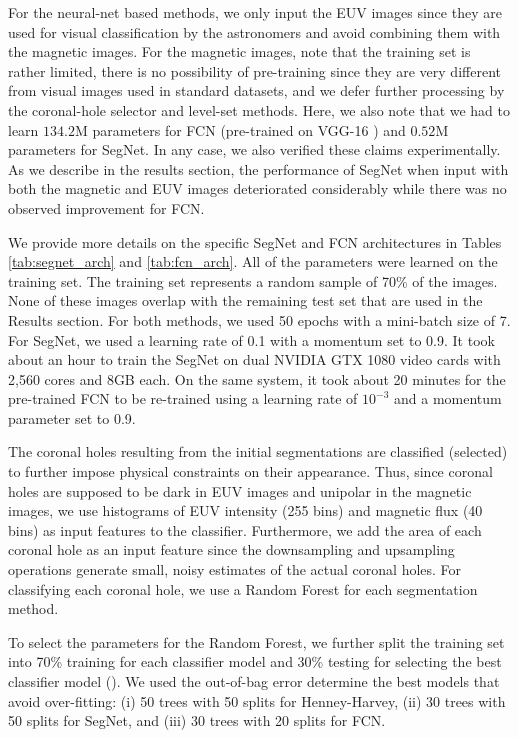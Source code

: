 \documentclass[journal]{IEEEtran}
\begin{document}
For the neural-net based methods,
   we only input the EUV images since they are used
   for visual classification by the astronomers and avoid
   combining them with the magnetic images.
For the magnetic images, 
    note that the training set is rather limited, 
   there is no possibility of pre-training since they are very different
   from visual images used in standard datasets,
   and we defer further processing by 
   the coronal-hole selector and level-set methods.   
Here, we also note that we had to learn $134.2$M parameters for FCN
   (pre-trained on VGG-16 \cite{VGGNet,VGG16})
   and $0.52$M parameters for SegNet.
In any case, we also verified these claims experimentally.
As we describe in the results section, the performance
   of SegNet when input with both the magnetic and EUV images 
   deteriorated considerably while there was no observed 
   improvement for FCN.
  
   
We provide more details on the specific SegNet and FCN
   architectures in Tables \ref{tab:segnet_arch} and \ref{tab:fcn_arch}.
All of the parameters were learned on the training set.
The training set represents a random sample of 70\% of the images.
None of these images overlap with the remaining test set that
   are used in the Results section.
For both methods, we used 50 epochs with a mini-batch size of 7.
For SegNet, we used a learning rate of 0.1 with a momentum set to 0.9.
It took about an hour to train the SegNet on dual NVIDIA GTX 1080 video cards 
    with 2,560 cores and 8GB each.
On the same system, it took about 20 minutes for the pre-trained FCN to be re-trained   
   using a learning rate of $10^{-3}$ and a momentum parameter set to 0.9.

The coronal holes resulting from the initial segmentations
   are classified (selected) to further impose physical constraints
   on their appearance.
Thus, since coronal holes are supposed to be dark in EUV images
   and unipolar in the magnetic images, we use
   histograms of EUV intensity (255 bins) and magnetic flux (40 bins)
   as input features to the classifier.
Furthermore, we add the area of each coronal hole as an input feature
   since the downsampling and upsampling operations
   generate small, noisy estimates of the actual coronal holes.
For classifying each coronal hole, we use a Random Forest for each segmentation method.

To select the parameters for the Random Forest, we further split
    the training set into 70\% training for each classifier model
    and 30\% testing for selecting the best classifier model
    (\cite{ESLII}).
We used the out-of-bag error determine the best models
    that avoid over-fitting:
    (i)   50 trees with 50 splits for Henney-Harvey,
    (ii)  30 trees with 50 splits for SegNet, and
    (iii) 30 trees with 20 splits for FCN.  
   
\end{document}
